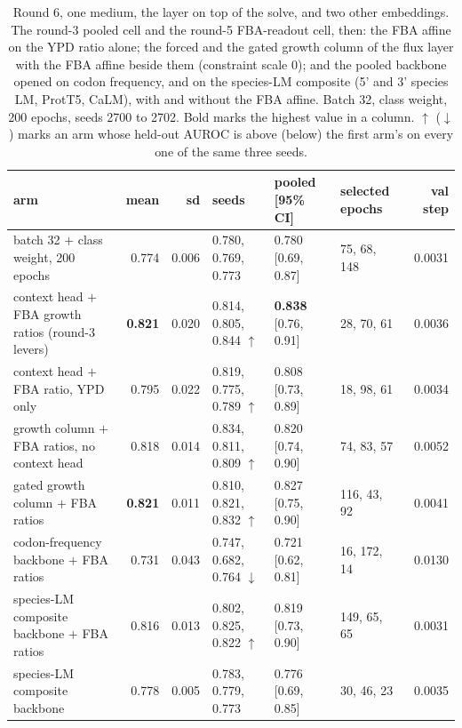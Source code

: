 \begin{table}[H]
  \centering
  \footnotesize
  \caption[Round 6, one medium, the layer on top of the solve, and two other embeddings]{Round 6, one medium, the layer on top of the solve, and two other embeddings. The round-3 pooled cell and the round-5 FBA-readout cell, then: the FBA affine on the YPD ratio alone; the forced and the gated growth column of the flux layer with the FBA affine beside them (constraint scale 0); and the pooled backbone opened on codon frequency, and on the species-LM composite (5' and 3' species LM, ProtT5, CaLM), with and without the FBA affine. Batch 32, class weight, 200 epochs, seeds 2700 to 2702. Bold marks the highest value in a column. $\uparrow$ ($\downarrow$) marks an arm whose held-out AUROC is above (below) the first arm's on every one of the same three seeds.}
  \label{tab:w17}
  \begin{tabular}{@{}p{52mm}rrlllr@{}}
    \hline
    arm & mean & sd & seeds & pooled [95\% CI] & selected epochs & val step \\
    \hline
    batch 32 $+$ class weight, 200 epochs & 0.774 & 0.006 & 0.780, 0.769, 0.773 & 0.780 [0.69, 0.87] & 75, 68, 148 & 0.0031 \\
    context head $+$ FBA growth ratios (round-3 levers) & \textbf{0.821} & 0.020 & 0.814, 0.805, 0.844 $\uparrow$ & \textbf{0.838} [0.76, 0.91] & 28, 70, 61 & 0.0036 \\
    context head $+$ FBA ratio, YPD only & 0.795 & 0.022 & 0.819, 0.775, 0.789 $\uparrow$ & 0.808 [0.73, 0.89] & 18, 98, 61 & 0.0034 \\
    growth column $+$ FBA ratios, no context head & 0.818 & 0.014 & 0.834, 0.811, 0.809 $\uparrow$ & 0.820 [0.74, 0.90] & 74, 83, 57 & 0.0052 \\
    gated growth column $+$ FBA ratios & \textbf{0.821} & 0.011 & 0.810, 0.821, 0.832 $\uparrow$ & 0.827 [0.75, 0.90] & 116, 43, 92 & 0.0041 \\
    codon-frequency backbone $+$ FBA ratios & 0.731 & 0.043 & 0.747, 0.682, 0.764 $\downarrow$ & 0.721 [0.62, 0.81] & 16, 172, 14 & 0.0130 \\
    species-LM composite backbone $+$ FBA ratios & 0.816 & 0.013 & 0.802, 0.825, 0.822 $\uparrow$ & 0.819 [0.73, 0.90] & 149, 65, 65 & 0.0031 \\
    species-LM composite backbone & 0.778 & 0.005 & 0.783, 0.779, 0.773 & 0.776 [0.69, 0.85] & 30, 46, 23 & 0.0035 \\
    \hline
  \end{tabular}
\end{table}
